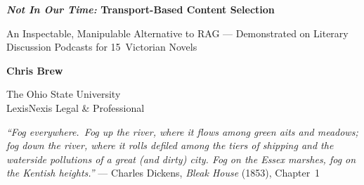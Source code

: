 \documentclass[landscape]{article}
\newcommand{\titlesize}{\fontsize{60}{66}\selectfont}
\newcommand{\subtitlesize}{\fontsize{23}{29}\selectfont}
\newcommand{\authorsize}{\fontsize{24}{30}\selectfont}
\newcommand{\bodysize}{\fontsize{20}{26}\selectfont}
\newcommand{\smallbody}{\fontsize{18}{23}\selectfont}
\begin{document}
\pagecolor{cream}
\bodysize

\begin{tcolorbox}[enhanced, colback=burgundydark,
  colframe=burgundydark, arc=4pt,
  left=18pt, right=18pt, top=14pt, bottom=14pt]

  \begin{minipage}[c]{0.72\textwidth}
    {\sffamily\bfseries\titlesize\color{cream}%
      \textit{Not In Our Time:} Transport-Based Content Selection}\par
    \vspace{4pt}
    {\subtitlesize\color{goldlight}%
      An Inspectable, Manipulable Alternative to RAG ---
      Demonstrated on Literary Discussion Podcasts for 15~Victorian Novels}
  \end{minipage}\hfill
  \begin{minipage}[c]{0.26\textwidth}\raggedleft
    {\sffamily\bfseries\authorsize\color{cream}Chris Brew}\par
    \vspace{2pt}
    {\subtitlesize\color{goldpale}%
      The Ohio State University\\
      LexisNexis Legal \& Professional}\par
    \vspace{6pt}
    {\small\color{goldlight}%
      }
  \end{minipage}
\end{tcolorbox}

\vspace{0.04in}

\begin{tcolorbox}[enhanced, colback=parchment, colframe=parchment,
  borderline west={3pt}{0pt}{gold}, arc=0pt, outer arc=3pt,
  left=12pt, right=12pt, top=6pt, bottom=6pt]
  {\bodysize\itshape\color{charcoal}%
    ``Fog everywhere.\ Fog up the river, where it flows among green aits
    and meadows; fog down the river, where it rolls defiled among the tiers
    of shipping and the waterside pollutions of a great (and dirty) city.
    Fog on the Essex marshes, fog on the Kentish heights.''}\hfill
  {\smallbody\color{warmgray}--- Charles Dickens, \textit{Bleak House}
    (1853), Chapter~1}
\end{tcolorbox}
\end{document}
